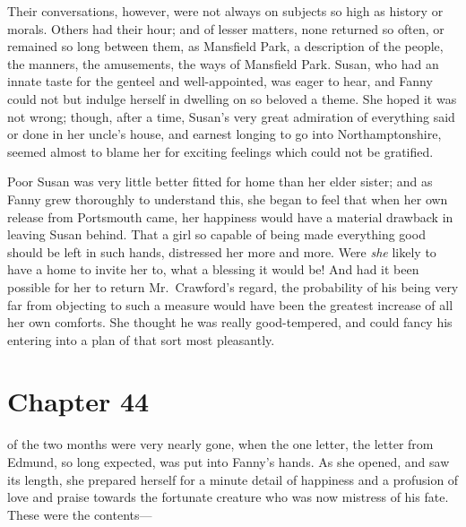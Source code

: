 Their conversations, however, were not always on subjects
so high as history or morals.  Others had their hour;
and of lesser matters, none returned so often,
or remained so long between them, as Mansfield Park,
a description of the people, the manners, the amusements,
the ways of Mansfield Park.  Susan, who had an innate taste
for the genteel and well-appointed, was eager to hear,
and Fanny could not but indulge herself in dwelling on
so beloved a theme.  She hoped it was not wrong; though,
after a time, Susan's very great admiration of everything
said or done in her uncle's house, and earnest longing
to go into Northamptonshire, seemed almost to blame
her for exciting feelings which could not be gratified.

Poor Susan was very little better fitted for home
than her elder sister; and as Fanny grew thoroughly
to understand this, she began to feel that when her
own release from Portsmouth came, her happiness would
have a material drawback in leaving Susan behind.
That a girl so capable of being made everything good should
be left in such hands, distressed her more and more.
Were \emph{she} likely to have a home to invite her to,
what a blessing it would be!  And had it been possible
for her to return Mr.\ Crawford's regard, the probability
of his being very far from objecting to such a measure would
have been the greatest increase of all her own comforts.
She thought he was really good-tempered, and could fancy
his entering into a plan of that sort most pleasantly.



\chapter{Chapter 44}

 of the two months were very nearly gone,
when the one letter, the letter from Edmund, so long expected,
was put into Fanny's hands.  As she opened, and saw
its length, she prepared herself for a minute detail
of happiness and a profusion of love and praise towards
the fortunate creature who was now mistress of his fate.
These were the contents---%


